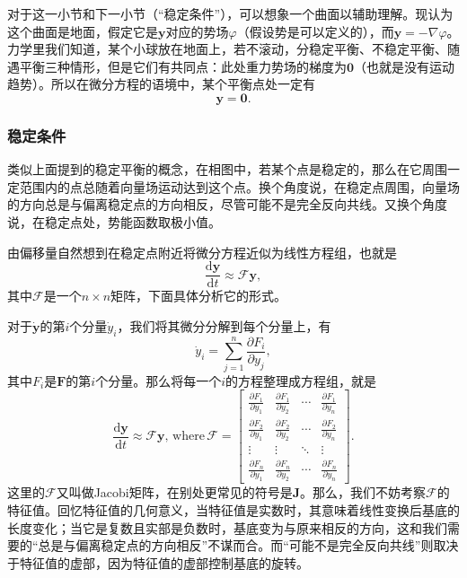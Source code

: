 \documentclass[a4paper, 12pt]{article}
\begin{document}
    对于这一小节和下一小节（“稳定条件”），可以想象一个曲面以辅助理解。现认为这个曲面是地面，假定它是$\boldsymbol y$对应的势场$\varphi$（假设势是可以定义的），而$\boldsymbol y=-\nabla \varphi$。力学里我们知道，某个小球放在地面上，若不滚动，分稳定平衡、不稳定平衡、随遇平衡三种情形，但是它们有共同点：此处重力势场的梯度为$\boldsymbol 0$（也就是没有运动趋势）。所以在微分方程的语境中，某个平衡点处一定有
    \[
    \boldsymbol y=\boldsymbol 0.
    \]

    \subsubsection{稳定条件}

    类似上面提到的稳定平衡的概念，在相图中，若某个点是稳定的，那么在它周围一定范围内的点总随着向量场运动达到这个点。换个角度说，在稳定点周围，向量场的方向总是与偏离稳定点的方向相反，尽管可能不是完全反向共线。又换个角度说，在稳定点处，势能函数取极小值。

    由偏移量自然想到在稳定点附近将微分方程近似为线性方程组，也就是
    \[
    \frac{\mathrm d\boldsymbol y}{\mathrm dt}\approx\mathcal F\boldsymbol y,
    \]
    其中$\mathcal F$是一个$n\times n$矩阵，下面具体分析它的形式。

    对于$\dot{\boldsymbol y}$的第$i$个分量$\dot y_i$，我们将其微分分解到每个分量上，有
    \[
    \dot y_i=\sum_{j=1}^n\frac{\partial F_i}{\partial y_j},
    \]
    其中$F_i$是$\boldsymbol F$的第$i$个分量。那么将每一个$i$的方程整理成方程组，就是
    \[
    \frac{\mathrm d\boldsymbol y}{\mathrm dt}\approx\mathcal F\boldsymbol y,\,\mathrm{where}\,\mathcal F=
    \begin{bmatrix}
        \frac{\partial F_1}{\partial y_1} & \frac{\partial F_1}{\partial y_2} & \cdots & \frac{\partial F_1}{\partial y_n}\\
        \frac{\partial F_2}{\partial y_1} & \frac{\partial F_2}{\partial y_2} & \cdots & \frac{\partial F_2}{\partial y_n}\\
        \vdots & \vdots & \ddots & \vdots\\
        \frac{\partial F_n}{\partial y_1} & \frac{\partial F_n}{\partial y_2} & \cdots & \frac{\partial F_n}{\partial y_n}
    \end{bmatrix}.
    \]
    这里的$\mathcal F$又叫做Jacobi矩阵，在别处更常见的符号是$\boldsymbol J$。那么，我们不妨考察$\mathcal F$的特征值。回忆特征值的几何意义，当特征值是实数时，其意味着线性变换后基底的长度变化；当它是复数且实部是负数时，基底变为与原来相反的方向，这和我们需要的“总是与偏离稳定点的方向相反”不谋而合。而“可能不是完全反向共线”则取决于特征值的虚部，因为特征值的虚部控制基底的旋转。
\end{document}

